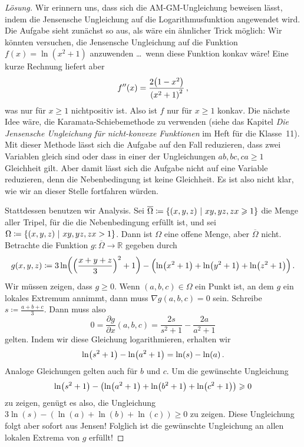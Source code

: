 \begin{proof}[Lösung]
	Wir erinnern uns, dass sich die AM-GM-Ungleichung beweisen lässt, indem die Jensensche Ungleichung auf die Logarithmusfunktion angewendet wird. Die Aufgabe sieht zunächst so aus, als wäre ein ähnlicher Trick möglich: Wir könnten versuchen, die Jensensche Ungleichung auf die Funktion $f(x)=\ln(x^2+1)$ anzuwenden \ldots\ wenn diese Funktion konkav wäre! Eine kurze Rechnung liefert aber
	\begin{equation*}
		f''(x)=\frac{2\parens*{1-x^2}}{\parens*{x^2+1}^2}\,,
	\end{equation*}
	was nur für $x\geqslant 1$ nichtpositiv ist. Also ist $f$ nur für $x\geqslant 1$ konkav. Die nächste Idee wäre, die Karamata-Schiebemethode zu verwenden (siehe das Kapitel \emph{Die Jensensche Ungleichung für nicht-konvexe Funktionen} im Heft für die Klasse~11). Mit dieser Methode lässt sich die Aufgabe auf den Fall reduzieren, dass zwei Variablen gleich sind oder dass in einer der Ungleichungen $ab,bc,ca\geqslant 1$ Gleichheit gilt. Aber damit lässt sich die Aufgabe nicht auf eine Variable reduzieren, denn die Nebenbedingung ist keine Gleichheit. Es ist also nicht klar, wie wir an dieser Stelle fortfahren würden.
	
	Stattdessen benutzen wir Analysis. Sei $\overline{\Omega}\coloneqq \braces*{(x,y,z)\ \middle|\ xy,yz,zx\geqslant 1}$ die Menge aller Tripel, für die die Nebenbedingung erfüllt ist, und sei $\Omega\coloneqq \braces*{(x,y,z)\ \middle|\ xy,yz,zx> 1}$. Dann ist $\Omega$ eine offene Menge, aber $\overline{\Omega}$ nicht. Betrachte die Funktion $g\colon\overline{\Omega}\rightarrow \mathbb R$ gegeben durch
	\begin{equation*}
		g(x,y,z)\coloneqq 3\ln\parens*{\parens*{\frac{x+y+z}{3}}^2+1}-\parens[\Big]{\ln\parens*{x^2+1}+\ln\parens*{y^2+1}+\ln\parens*{z^2+1}}\,.
	\end{equation*}
	Wir müssen zeigen, dass $g\geqslant 0$. Wenn $(a,b,c)\in\Omega$ ein Punkt ist, an dem $g$ ein lokales Extremum annimmt, dann muss $\nabla g(a,b,c)=0$ sein. Schreibe $s\coloneqq \frac{a+b+c}{3}$. Dann muss also
	\begin{equation*}
		0=\frac{\partial g}{\partial x}(a,b,c)=\frac{2s}{s^2+1}-\frac{2a}{a^2+1}
	\end{equation*}
	gelten. Indem wir diese Gleichung logarithmieren, erhalten wir
	\begin{equation*}
		\ln\parens*{s^2+1}-\ln\parens*{a^2+1}=\ln(s)-\ln(a)\,.
	\end{equation*}
	Analoge Gleichungen gelten auch für $b$ und $c$. Um die gewünschte Ungleichung
	\begin{equation*}
		\ln\parens*{s^2+1}-\parens*{\ln\parens*{a^2+1}+\ln\parens*{b^2+1}+\ln\parens*{c^2+1}}\geqslant 0
	\end{equation*}
	zu zeigen, genügt es also, die Ungleichung $3\ln(s)-(\ln(a)+\ln(b)+\ln(c))\geqslant 0$ zu zeigen. Diese Ungleichung folgt aber sofort aus Jensen! Folglich ist die gewünschte Ungleichung an allen lokalen Extrema von $g$ erfüllt!
	

\end{proof}
